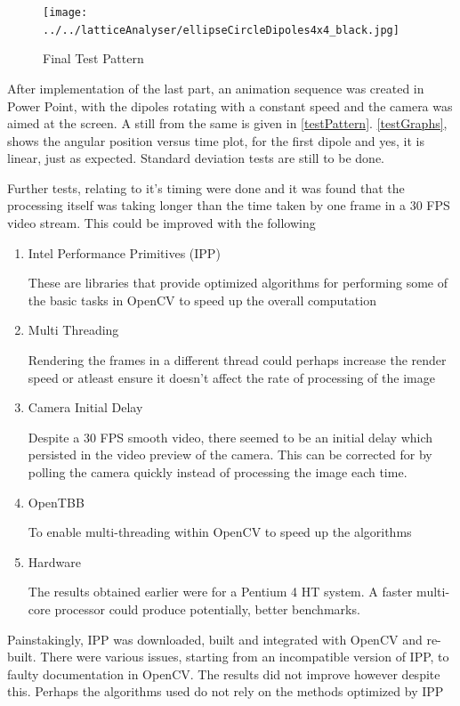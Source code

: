 			\begin{figure}[bth]
				\begin{center}
					\texttt{[image: ../../latticeAnalyser/ellipseCircleDipoles4x4\_black.jpg]}
				\end{center}
			\caption[Final Test Pattern]{Final Test Pattern}
			\label{testPattern}
			\end{figure}

			After implementation of the last part, an animation sequence was created in Power Point, with the dipoles rotating with a constant speed and the camera was aimed at the screen. A still from the same is given in \autoref{testPattern}. \autoref{testGraphs}, shows the angular position versus time plot, for the first dipole and yes, it is linear, just as expected. Standard deviation tests are still to be done.
			\par
			Further tests, relating to it's timing were done and it was found that the processing itself was taking longer than the time taken by one frame in a 30 FPS video stream. This could be improved with the following
			\begin{enumerate}
				\item Intel Performance Primitives (IPP)
					\par
					These are libraries that provide optimized algorithms for performing some of the basic tasks in OpenCV to speed up the overall computation
				\item Multi Threading
					\par
					Rendering the frames in a different thread could perhaps increase the render speed or atleast ensure it doesn't affect the rate of processing of the image
				\item Camera Initial Delay
					\par
					Despite a 30 FPS smooth video, there seemed to be an initial delay which persisted in the video preview of the camera. This can be corrected for by polling the camera quickly instead of processing the image each time.
				\item OpenTBB
					\par
					To enable multi-threading within OpenCV to speed up the algorithms
				\item Hardware
					\par
					The results obtained earlier were for a Pentium 4 HT system. A faster multi-core processor could produce potentially, better benchmarks.
			\end{enumerate}
			Painstakingly, IPP was downloaded, built and integrated with OpenCV and re-built. There were various issues, starting from an incompatible version of IPP, to faulty documentation in OpenCV. The results did not improve however despite this. Perhaps the algorithms used do not rely on the methods optimized by IPP
